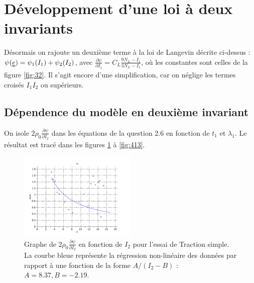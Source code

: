 \documentclass[a4paper,11pt]{article}
\newcommand{\FRAC}{\displaystyle\frac}
\newcommand{\tens}{\uuline}
\begin{document}
\section{Développement d'une loi à deux invariants}
Désormais on rajoute un deuxième terme à la loi de Langevin décrite ci-dessus : $\psi(\tens{e}) = \psi_1(I_1) + \psi_2(I_2)$, avec $\FRAC{\partial\psi}{\partial I_1} = C_L\frac{9N_L-I_1}{3N_L-I_1}$, où les constantes sont celles de la figure \ref{fig:32}. Il s'agit encore d'une simplification, car on néglige les termes croisés $I_1I_2$ ou supérieurs.

\subsection{Dépendence du modèle en deuxième invariant}
On isole $2 \rho_0 \frac{\partial\psi}{\partial I_2}$ dans les équations de la question 2.6 en fonction de $t_1$ et $\lambda_1$. Le résultat est tracé dans les figures \ref{fig:411} à \ref{fig:413}.

\begin{figure}[!ht]
\centering
\includegraphics[width=0.5\textwidth]{scilab_prof/q411.pdf}
\caption{Graphe de $2 \rho_0 \frac{\partial\psi}{\partial I_2}$ en fonction de $I_2$ pour l'essai de Traction simple. La courbe bleue représente la régression non-linéaire des données par rapport à une fonction de la forme $A/(I_2-B)$ : $A = 8.37, B = -2.19$.}
\label{fig:411}
\end{figure}
%
\end{document}
